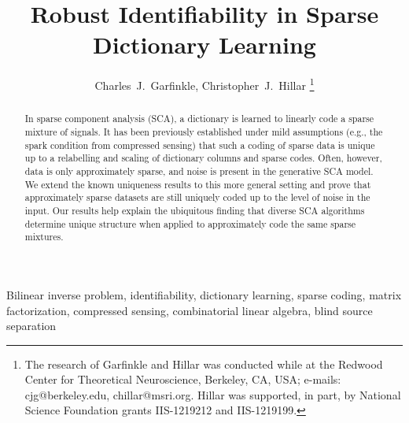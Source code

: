 \documentclass[journal, onecolumn]{IEEEtran}
\begin{document}
\title{Robust Identifiability in Sparse Dictionary Learning}

\author{Charles~J.~Garfinkle,  Christopher~J.~Hillar%
\thanks{The research of Garfinkle and Hillar was conducted while at the Redwood Center for Theoretical Neuroscience, Berkeley, CA, USA; e-mails: cjg@berkeley.edu, chillar@msri.org.  Hillar was supported, in part, by National Science Foundation grants IIS-1219212 and IIS-1219199.}}%

\maketitle

\begin{abstract}
In sparse component analysis (SCA), a dictionary is learned to linearly code a sparse mixture of signals.  It has been previously established  under mild assumptions (e.g., the spark condition from compressed sensing) that such a coding of sparse data is unique up to a relabelling and scaling of dictionary columns and sparse codes.  Often, however, data is only approximately sparse, and noise is present in the generative SCA model.  We extend the known uniqueness results to this more general setting and prove that approximately sparse datasets are still uniquely coded up to the level of noise in the input.  Our results help explain the ubiquitous finding that diverse SCA algorithms determine unique structure when applied to approximately code the same sparse mixtures.
\end{abstract}

\begin{IEEEkeywords}
Bilinear inverse problem, identifiability, dictionary learning, sparse coding, matrix factorization, compressed sensing, combinatorial linear algebra, blind source separation
\end{IEEEkeywords}

\end{document}

